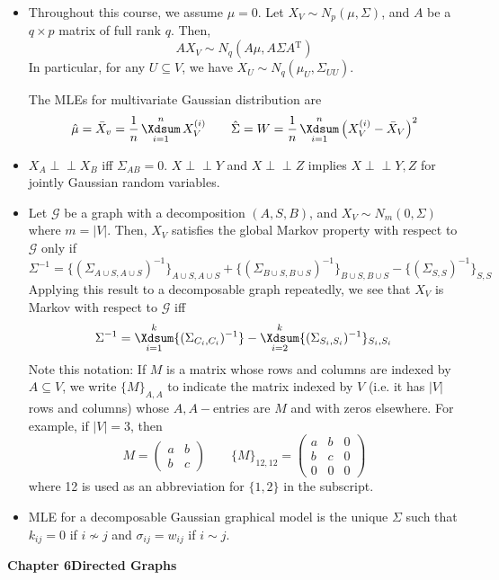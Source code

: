 \documentclass[UTF8]{book}
\DeclareMathOperator*{\Xsum}{\mathchoice{\Xdsum}{\Xtsum}{\Xtsum}{\Xtsum}}
\newcommand{\perpp}{\ensuremath{\perp\!\!\!\!\!\perp}}
\newcommand{\et}{&}
\newcommand{\f}{^2}
\renewcommand{\t}{\ensuremath{^\mathrm{T}}}
\begin{document}
\begin{itemize}
\item Throughout this course, we assume $\mu = 0$. Let $X_V\sim N_p(\mu,\Sigma)$, and $A$ be a $q\times p$ matrix of full rank $q$. Then,
$$
AX_V\sim N_q(A\mu , A\Sigma A\t)
$$
In particular, for any $U\subseteq V$, we have $X_U\sim N_q(\mu_U,\Sigma_{UU})$.

The MLEs for multivariate Gaussian distribution are 
$$
\hat{\mu} = \bar{X}_v = \dfrac{1}{n}\Xsum_{i=1}^n X_V^{(i)} \qquad \hat{\Sigma} = W = \dfrac{1}{n}\Xsum_{i=1}^n\left(X_V^{(i)} - \bar{X}_V\right)\f
$$
\item $X_A\perpp X_B$ iff $\Sigma_{AB}=0$. $X\perpp Y$ and $X\perpp Z$ implies $X\perpp Y,Z$ for jointly Gaussian random variables.
\item Let $\mathcal{G}$ be a graph with a decomposition $(A,S,B)$, and $X_V\sim N_m(0, \Sigma)$ where $m = |V|$. Then, $X_V$ satisfies the global Markov property with respect to $\mathcal{G}$ only if
$$
\Sigma^{-1} = \{(\Sigma_{A\cup S, A\cup S})^{-1}\}_{A\cup S, A\cup S} + \{(\Sigma_{B\cup S, B\cup S})^{-1}\}_{B\cup S, B\cup S} - \{(\Sigma_{S,S})^{-1}\}_{S,S}
$$
Applying this result to a decomposable graph repeatedly, we see that $X_V$ is Markov with respect to $\mathcal{G}$ iff
$$
\Sigma^{-1} = \Xsum_{i=1}^k\{(\Sigma_{C_i,C_i})^{-1}\} - \Xsum_{i=2}^k\{(\Sigma_{S_i,S_i})^{-1}\}_{S_i, S_i}
$$
Note this notation: If $M$ is a matrix whose rows and columns are indexed by $A\subseteq V$, we write $\{M\}_{A,A}$ to indicate the matrix indexed by $V$ (i.e. it has $|V|$ rows and columns) whose $A,A-$entries are $M$ and with zeros elsewhere. For example, if $|V|=3$, then
$$
M = \left(\begin{matrix}
a \et b\\
b \et c
\end{matrix}\right) \qquad \{M\}_{12,12} = \left(\begin{matrix}
a \et b \et 0\\
b \et c \et 0\\
0 \et 0 \et 0
\end{matrix}\right)
$$
where 12 is used as an abbreviation for $\{1,2\}$ in the subscript.
\item MLE for a decomposable Gaussian graphical model is the unique $\Sigma$ such that $k_{ij} = 0$ if $i\not\sim j$ and $\sigma_{ij} = w_{ij}$ if $i\sim j$.
\end{itemize}
\large{\textbf{Chapter 6\quad Directed Graphs}}
\end{document}
